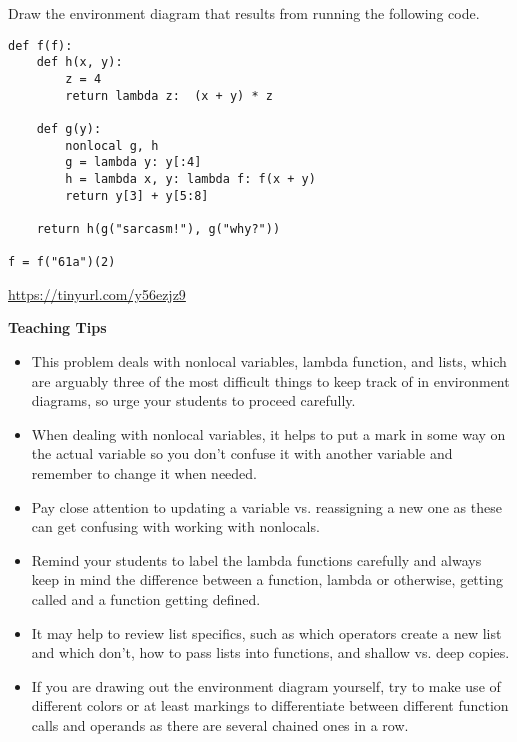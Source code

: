 \begin{blocksection}
\question Draw the environment diagram that results from running the following code.
\begin{lstlisting}
def f(f):
    def h(x, y):
        z = 4
        return lambda z:  (x + y) * z
  
    def g(y):
        nonlocal g, h
        g = lambda y: y[:4]
        h = lambda x, y: lambda f: f(x + y)
        return y[3] + y[5:8]

    return h(g("sarcasm!"), g("why?"))

f = f("61a")(2)
\end{lstlisting}

\begin{solution}[1in]
\url{https://tinyurl.com/y56ezjz9}
\end{solution}
\end{blocksection}

\begin{blocksection}
\begin{guide}
\textbf{Teaching Tips}
\begin{itemize}
	\item This problem deals with nonlocal variables, lambda function, and lists, which are arguably three of the most difficult things to keep track of in environment diagrams, so urge your students to proceed carefully.
	\item When dealing with nonlocal variables, it helps to put a mark in some way on the actual variable so you don't confuse it with another variable and remember to change it when needed.
	\item Pay close attention to updating a variable vs. reassigning a new one as these can get confusing with working with nonlocals.
	\item Remind your students to label the lambda functions carefully and always keep in mind the difference between a function, lambda or otherwise, getting called and a function getting defined.
	\item It may help to review list specifics, such as which operators create a new list and which don't, how to pass lists into functions, and shallow vs. deep copies.
	\item If you are drawing out the environment diagram yourself, try to make use of different colors or at least markings to differentiate between different function calls and operands as there are several chained ones in a row.
\end{itemize}
\end{guide}
\end{blocksection}

